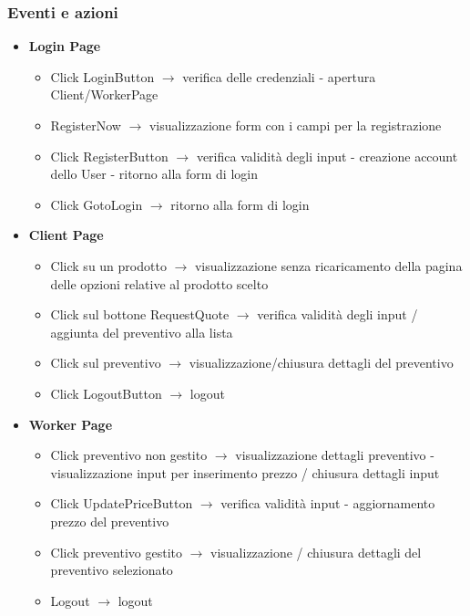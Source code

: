 \documentclass[a4paper, 12pt]{article}
\begin{document}
\subsubsection{Eventi e azioni}
\begin{itemize}
	\item \textbf{Login Page}
	\begin{itemize}
		\item Click LoginButton $\rightarrow$ verifica delle credenziali - apertura Client/WorkerPage
		\item RegisterNow $\rightarrow$ visualizzazione form con i campi per la registrazione
		\item Click RegisterButton $\rightarrow$ verifica validità degli input - creazione account dello User - ritorno alla form di login
		\item Click GotoLogin $\rightarrow$ ritorno alla form di login
	\end{itemize}
	\item \textbf{Client Page}
	\begin{itemize}
		\item Click su un prodotto $\rightarrow$ visualizzazione senza ricaricamento della pagina delle opzioni relative al prodotto scelto
		\item Click sul bottone RequestQuote $\rightarrow$ verifica validità degli input / aggiunta del preventivo alla lista 
		\item Click sul preventivo $\rightarrow$ visualizzazione/chiusura dettagli del preventivo
		\item Click LogoutButton $\rightarrow$ logout
	\end{itemize}
	\newpage
	\item \textbf{Worker Page}
	\begin{itemize}
		\item Click preventivo non gestito $\rightarrow$ visualizzazione dettagli preventivo - visualizzazione input per inserimento prezzo / chiusura dettagli input 
		\item Click UpdatePriceButton $\rightarrow$ verifica validità input - aggiornamento prezzo del preventivo 
		\item Click preventivo gestito $\rightarrow$ visualizzazione / chiusura dettagli del preventivo selezionato 
		\item Logout $\rightarrow$ logout 
	\end{itemize}
\end{itemize}
\newpage
\end{document}
